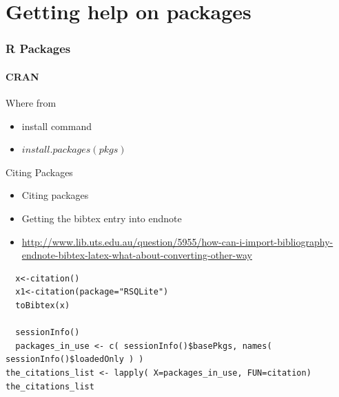 \documentclass[12pt]{beamer}\usepackage[]{graphicx}\usepackage[]{color}
\begin{document}
\section*{Getting help on packages}
\begin{frame}[fragile]
  \frametitle{R Packages}
  \framesubtitle{CRAN}
  
   \begin{block}{Where from}
  \begin{itemize} 
  \item install command
  \item $install.packages(pkgs)$
  \end{itemize}
  \end{block}

  \begin{block}{Citing Packages}
  \begin{itemize}
 \item Citing packages
 \item Getting the bibtex entry into endnote
 \item \url{http://www.lib.uts.edu.au/question/5955/how-can-i-import-bibliography-endnote-bibtex-latex-what-about-converting-other-way}
   \end{itemize}
  \end{block}
\begin{lstlisting}
  x<-citation()
  x1<-citation(package="RSQLite")
  toBibtex(x)
  
  sessionInfo()
  packages_in_use <- c( sessionInfo()$basePkgs, names( sessionInfo()$loadedOnly ) )
the_citations_list <- lapply( X=packages_in_use, FUN=citation)
the_citations_list
\end{lstlisting}


\end{frame}
\end{document}
